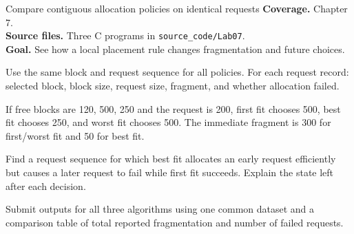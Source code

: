 \begin{labproject}{Compare contiguous allocation policies on identical requests}
\textbf{Coverage.} Chapter 7.\\
\textbf{Source files.} Three C programs in \texttt{source\_code/Lab07}.\\
\textbf{Goal.} See how a local placement rule changes fragmentation and future choices.

Use the same block and request sequence for all policies. For each request record: selected block, block size, request size, fragment, and whether allocation failed.

\begin{workedexample}
If free blocks are 120, 500, 250 and the request is 200, first fit chooses 500, best fit chooses 250, and worst fit chooses 500. The immediate fragment is 300 for first/worst fit and 50 for best fit.
\end{workedexample}

\begin{tryit}
Find a request sequence for which best fit allocates an early request efficiently but causes a later request to fail while first fit succeeds. Explain the state left after each decision.
\end{tryit}
\end{labproject}

\begin{labdeliverable}
Submit outputs for all three algorithms using one common dataset and a comparison table of total reported fragmentation and number of failed requests.
\end{labdeliverable}
